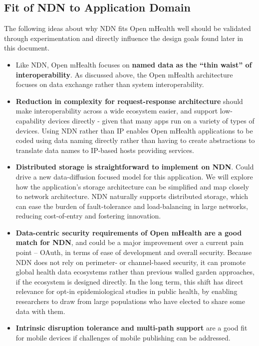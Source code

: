 \subsection{Fit of NDN to Application Domain}
The following ideas about why NDN fits Open mHealth well should be validated through experimentation and directly influence the design goals found later in this document. 
\begin{itemize}
\item Like NDN, Open mHealth  focuses on \textbf{named data as the ``thin waist'' of interoperability}. As discussed above, the Open mHealth architecture focuses on data exchange rather than system interoperability. 
\item \textbf{Reduction in complexity for request-response architecture} should make interoperability across a wide ecosystem easier, and support low-capability devices directly - given that many apps run on a variety of types of devices. Using NDN rather than IP enables Open mHealth applications to be coded using data naming directly rather than having to create abstractions to translate data names to IP-based hosts providing services.
\item \textbf{Distributed storage is straightforward to implement on NDN}. Could drive a new data-diffusion focused model for this application.  We will explore how the application's storage architecture can be simplified and map closely to network architecture.  NDN naturally supports distributed storage, which can ease the burden of fault-tolerance and load-balancing in large networks, reducing cost-of-entry and fostering innovation. 
\item \textbf{Data-centric security requirements of Open mHealth are a good match for NDN}, and could be a major improvement over a current pain point – OAuth, in terms of ease of development and overall security. Because NDN does not rely on perimeter- or channel-based security, it can promote global health data ecosystems rather than previous walled garden approaches, if the ecosystem is designed directly.  In the long term, this shift has direct relevance for opt-in epidemiological studies in public health, by enabling researchers to draw from large populations who have elected to share some data with them. 
\item \textbf{Intrinsic disruption tolerance and multi-path support} are a good fit for mobile devices if challenges of mobile publishing can be addressed. 
\end{itemize}


